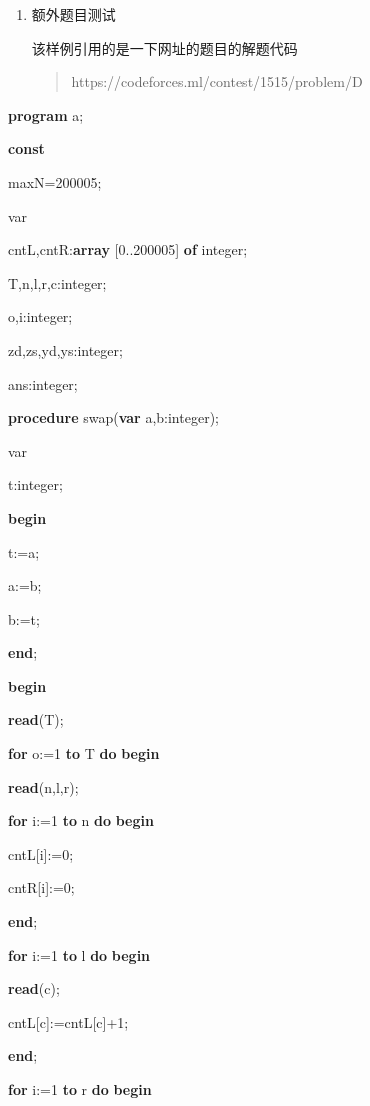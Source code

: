 \documentclass[]{ctexart}
\newenvironment{Shaded}{}{}
\newcommand{\DataTypeTok}[1]{\textcolor[rgb]{0.56,0.13,0.00}{#1}}
\newcommand{\DecValTok}[1]{\textcolor[rgb]{0.25,0.63,0.44}{#1}}
\newcommand{\KeywordTok}[1]{\textcolor[rgb]{0.00,0.44,0.13}{\textbf{#1}}}
\newcommand{\NormalTok}[1]{#1}
\begin{document}
\begin{enumerate}
\def\labelenumi{\arabic{enumi}.}
\item
  额外题目测试

  该样例引用的是一下网址的题目的解题代码

  \begin{quote}
  https://codeforces.ml/contest/1515/problem/D
  \end{quote}
\end{enumerate}

\begin{Shaded}
\begin{Highlighting}[]
\KeywordTok{program}\NormalTok{ a;
}
\KeywordTok{const} 

\NormalTok{    maxN=}\DecValTok{200005}\NormalTok{;
}
\NormalTok{var
}
\NormalTok{    cntL,cntR:}\KeywordTok{array}\NormalTok{ [}\DecValTok{0}\NormalTok{..}\DecValTok{200005}\NormalTok{] }\KeywordTok{of} \DataTypeTok{integer}\NormalTok{;
}
\NormalTok{    T,n,l,r,c:}\DataTypeTok{integer}\NormalTok{;
}
\NormalTok{    o,i:}\DataTypeTok{integer}\NormalTok{;
}
\NormalTok{    zd,zs,yd,ys:}\DataTypeTok{integer}\NormalTok{;
}
\NormalTok{    ans:}\DataTypeTok{integer}\NormalTok{;
}
\KeywordTok{procedure}\NormalTok{ swap(}\KeywordTok{var}\NormalTok{ a,b:}\DataTypeTok{integer}\NormalTok{);
}
\NormalTok{var
}
\NormalTok{    t:}\DataTypeTok{integer}\NormalTok{;
}
\KeywordTok{begin}

\NormalTok{    t:=a;
}
\NormalTok{    a:=b;
}
\NormalTok{    b:=t;
}
\KeywordTok{end}\NormalTok{;
}
 \KeywordTok{begin}

    \KeywordTok{read}\NormalTok{(T);
}
    \KeywordTok{for}\NormalTok{ o:=}\DecValTok{1} \KeywordTok{to}\NormalTok{ T }\KeywordTok{do} \KeywordTok{begin}

        \KeywordTok{read}\NormalTok{(n,l,r);
}
        \KeywordTok{for}\NormalTok{ i:=}\DecValTok{1} \KeywordTok{to}\NormalTok{ n }\KeywordTok{do} \KeywordTok{begin}

\NormalTok{            cntL[i]:=}\DecValTok{0}\NormalTok{;
}
\NormalTok{            cntR[i]:=}\DecValTok{0}\NormalTok{;
}
        \KeywordTok{end}\NormalTok{;
}
        \KeywordTok{for}\NormalTok{ i:=}\DecValTok{1} \KeywordTok{to}\NormalTok{ l }\KeywordTok{do} \KeywordTok{begin}

            \KeywordTok{read}\NormalTok{(c);
}
\NormalTok{            cntL[c]:=cntL[c]+}\DecValTok{1}\NormalTok{;
}
        \KeywordTok{end}\NormalTok{;
}
        \KeywordTok{for}\NormalTok{ i:=}\DecValTok{1} \KeywordTok{to}\NormalTok{ r }\KeywordTok{do} \KeywordTok{begin}


\end{Highlighting}
\end{Shaded}
\end{document}
